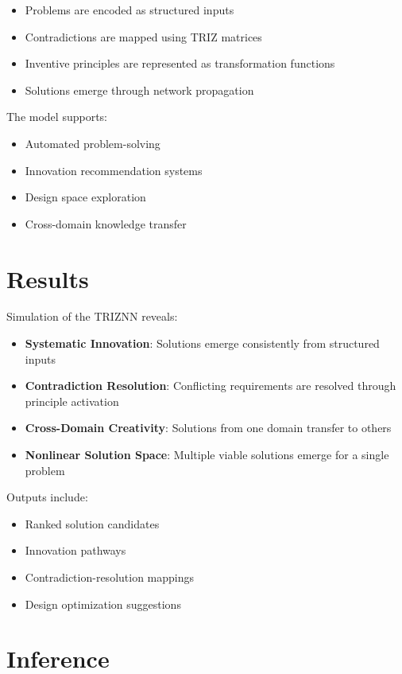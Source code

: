 \documentclass[12pt]{article}
\begin{document}
\begin{itemize}
\item Problems are encoded as structured inputs
\item Contradictions are mapped using TRIZ matrices
\item Inventive principles are represented as transformation functions
\item Solutions emerge through network propagation
\end{itemize}

The model supports:

\begin{itemize}
\item Automated problem-solving
\item Innovation recommendation systems
\item Design space exploration
\item Cross-domain knowledge transfer
\end{itemize}

\section{Results}

Simulation of the TRIZNN reveals:

\begin{itemize}
\item \textbf{Systematic Innovation}: Solutions emerge consistently from structured inputs
\item \textbf{Contradiction Resolution}: Conflicting requirements are resolved through principle activation
\item \textbf{Cross-Domain Creativity}: Solutions from one domain transfer to others
\item \textbf{Nonlinear Solution Space}: Multiple viable solutions emerge for a single problem
\end{itemize}

Outputs include:

\begin{itemize}
\item Ranked solution candidates
\item Innovation pathways
\item Contradiction-resolution mappings
\item Design optimization suggestions
\end{itemize}

\section{Inference}
\end{document}
